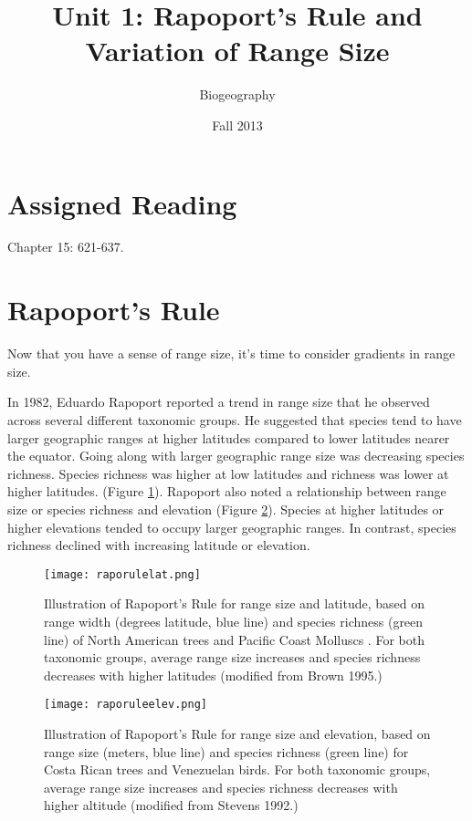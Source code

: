 \documentclass[12pt, oneside]{article}   	%
\title{Unit 1: Rapoport's Rule and\\Variation of Range Size}
\author{Biogeography}
\date{Fall 2013}							%
\begin{document}
\maketitle
\section{Assigned Reading}
Chapter 15: 621-637.

\section{Rapoport's Rule}

Now that you have a sense of range size, it's time to consider gradients in range size.

In 1982, Eduardo Rapoport reported a trend in range size that he observed across several different taxonomic groups.  He suggested that species tend to have larger geographic ranges at higher latitudes compared to lower latitudes nearer the equator. Going along with larger geographic range size was decreasing species richness.  Species richness was higher at low latitudes and richness was lower at higher latitudes.  (Figure \ref{raporulelat}). Rapoport also noted a relationship between range size or species richness and elevation (Figure \ref{raporuleelev}).  Species at higher latitudes or higher elevations tended to occupy larger geographic ranges.  In contrast, species richness declined with increasing latitude or elevation.

\begin{figure}
	\centering
		\texttt{[image: raporulelat.png]}  
		\caption{Illustration of Rapoport's Rule for range size and latitude, based on range width (degrees latitude, blue line) and species richness (green line) of North American trees and Pacific Coast Molluscs . For both taxonomic groups, average range size increases and species richness decreases with higher latitudes (modified from Brown 1995.)\label{raporulelat}}
		
\end{figure}

\begin{figure}
	\centering
		\texttt{[image: raporuleelev.png]}  
		\caption{Illustration of Rapoport's Rule for range size and elevation, based on range size (meters, blue line) and species richness (green line) for Costa Rican trees and Venezuelan birds. For both taxonomic groups, average range size increases and species richness decreases with higher altitude (modified from Stevens 1992.)\label{raporuleelev}}
\end{figure}
\end{document}
